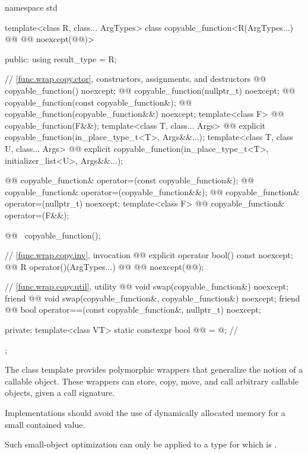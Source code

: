%
\begin{codeblock}
namespace std {
  template<class R, class... ArgTypes>
  class copyable_function<R(ArgTypes...) @\cv{}@ @@ noexcept(@@)> {
  public:
    using result_type = R;

    // \ref{func.wrap.copy.ctor}, constructors, assignments, and destructors
    @@ copyable_function() noexcept;
    @@ copyable_function(nullptr_t) noexcept;
    @@ copyable_function(const copyable_function&);
    @@ copyable_function(copyable_function&&) noexcept;
    template<class F> @@ copyable_function(F&&);
    template<class T, class... Args>
      @@ explicit copyable_function(in_place_type_t<T>, Args&&...);
    template<class T, class U, class... Args>
      @@ explicit copyable_function(in_place_type_t<T>, initializer_list<U>, Args&&...);

    @@ copyable_function& operator=(const copyable_function&);
    @@ copyable_function& operator=(copyable_function&&);
    @@ copyable_function& operator=(nullptr_t) noexcept;
    template<class F> @@ copyable_function& operator=(F&&);

    @@ ~copyable_function();

    // \ref{func.wrap.copy.inv}, invocation
    @@ explicit operator bool() const noexcept;
    @@ R operator()(ArgTypes...) @\cv{}@ @@ noexcept(@@);

    // \ref{func.wrap.copy.util}, utility
    @@ void swap(copyable_function&) noexcept;
    friend @@ void swap(copyable_function&, copyable_function&) noexcept;
    friend @@ bool operator==(const copyable_function&, nullptr_t) noexcept;

  private:
    template<class VT>
      static constexpr bool @@ = @\seebelow@;       // \expos
  };
}
\end{codeblock}

\pnum
The  class template provides polymorphic wrappers
that generalize the notion of a callable object.
These wrappers can store, copy, move, and call arbitrary callable objects,
given a call signature.

\pnum
\recommended
Implementations should avoid the use of dynamically allocated memory
for a small contained value.
\begin{note}
Such small-object optimization can only be applied to a type 
for which  is .
\end{note}

